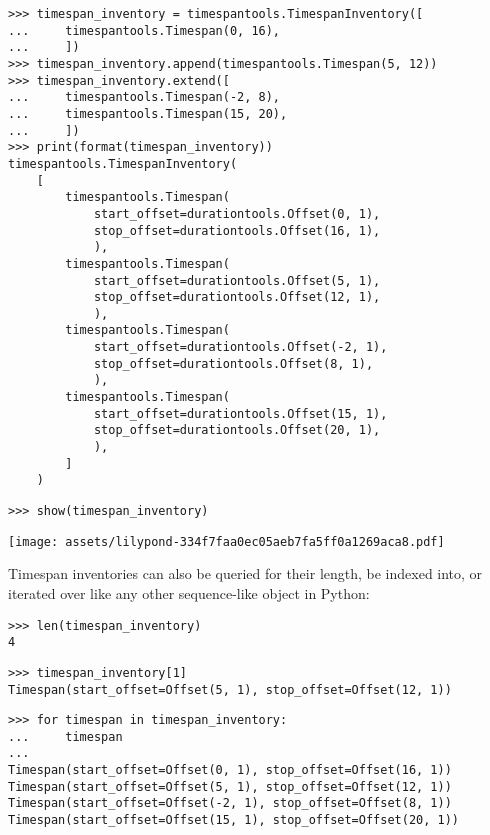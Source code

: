 \begin{singlespacing}
\vspace{-0.5\baselineskip}
\begin{lstlisting}
>>> timespan_inventory = timespantools.TimespanInventory([
...     timespantools.Timespan(0, 16),
...     ])
>>> timespan_inventory.append(timespantools.Timespan(5, 12))
>>> timespan_inventory.extend([
...     timespantools.Timespan(-2, 8),
...     timespantools.Timespan(15, 20),
...     ])
>>> print(format(timespan_inventory))
timespantools.TimespanInventory(
    [
        timespantools.Timespan(
            start_offset=durationtools.Offset(0, 1),
            stop_offset=durationtools.Offset(16, 1),
            ),
        timespantools.Timespan(
            start_offset=durationtools.Offset(5, 1),
            stop_offset=durationtools.Offset(12, 1),
            ),
        timespantools.Timespan(
            start_offset=durationtools.Offset(-2, 1),
            stop_offset=durationtools.Offset(8, 1),
            ),
        timespantools.Timespan(
            start_offset=durationtools.Offset(15, 1),
            stop_offset=durationtools.Offset(20, 1),
            ),
        ]
    )
\end{lstlisting}
\begin{lstlisting}
>>> show(timespan_inventory)
\end{lstlisting}
\noindent\texttt{[image: assets/lilypond-334f7faa0ec05aeb7fa5ff0a1269aca8.pdf]}
\end{singlespacing}

\noindent Timespan inventories can also be queried for their length, be indexed
into, or iterated over like any other sequence-like object in Python:

\begin{comment}
<abjad>
len(timespan_inventory)
timespan_inventory[1]
for timespan in timespan_inventory:
    timespan

</abjad>
\end{comment}

\begin{singlespacing}
\vspace{-0.5\baselineskip}
\begin{lstlisting}
>>> len(timespan_inventory)
4
\end{lstlisting}
\begin{lstlisting}
>>> timespan_inventory[1]
Timespan(start_offset=Offset(5, 1), stop_offset=Offset(12, 1))
\end{lstlisting}
\begin{lstlisting}
>>> for timespan in timespan_inventory:
...     timespan
...
Timespan(start_offset=Offset(0, 1), stop_offset=Offset(16, 1))
Timespan(start_offset=Offset(5, 1), stop_offset=Offset(12, 1))
Timespan(start_offset=Offset(-2, 1), stop_offset=Offset(8, 1))
Timespan(start_offset=Offset(15, 1), stop_offset=Offset(20, 1))
\end{lstlisting}
\end{singlespacing}

